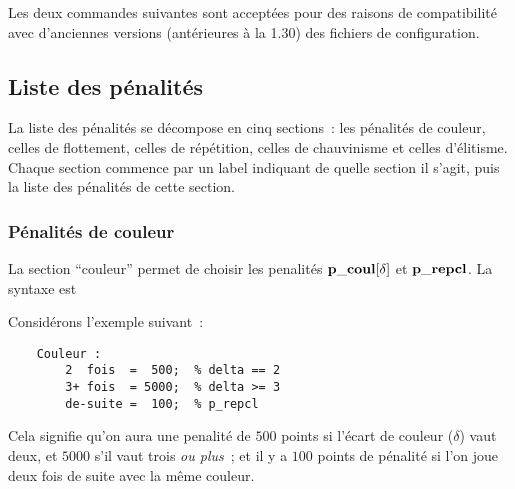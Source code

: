 \documentclass[10pt]{article}
\begin{document}
\medbreak

Les deux commandes suivantes sont accept\'ees pour des raisons de compatibilit\'e avec d'anciennes versions (ant\'erieures \`a la 1.30) des fichiers de configuration.

\medbreak


\medbreak

\subsection{Liste des p\'enalit\'es}

La liste des p\'enalit\'es se d\'ecompose en cinq sections~: les 
p\'enalit\'es de couleur, celles de flottement, celles de 
r\'ep\'etition, celles de chauvinisme et celles d'\'elitisme.  Chaque 
section commence par un label indiquant de quelle section il s'agit, 
puis la liste des p\'enalit\'es de cette section.

\medbreak
{}
\medbreak

\subsubsection{P\'enalit\'es de couleur}

La section ``couleur'' permet de choisir les penalit\'es ${\bf p\_coul}
[\delta]$ et $\bf p\_repcl$. La syntaxe est

\medbreak
{}
\medbreak

\noindent Consid\'erons l'exemple suivant~:
\begin{verbatim}
    Couleur :
        2  fois  =  500;  % delta == 2
        3+ fois  = 5000;  % delta >= 3
        de-suite =  100;  % p_repcl
\end{verbatim}
Cela signifie qu'on aura une penalit\'e de $500$ points si l'\'ecart de
couleur ($\delta$) vaut deux, et $5000$ s'il vaut trois {\em ou plus\/}~; et
il y a $100$ points de p\'enalit\'e si l'on joue deux fois de suite avec la
m\^eme couleur.
\end{document}

